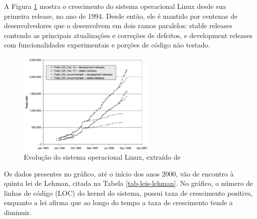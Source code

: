 A Figura \ref{Figura1} mostra o crescimento do sistema operacional Linux desde sua primeira release, no ano de 1994. Desde então, ele é mantido por centenas de desenvolvedores que o desenvolvem em dois ramos paralelos: stable releases contendo as principais atualizações e correções de defeitos, e development releases com funcionalidades experimentais e porções de código não testado.

\graphicspath{{figuras/}}
\begin{figure}[H]
\centering
\includegraphics[width=0.6\textwidth]{linux-evolution}
\caption{Evolução do sistema operacional Linux, extraído de \cite{godfrey2000evolution}}
\label{Figura1}
\end{figure}

Os dados presentes no gráfico, até o início dos anos 2000, vão de encontro à quinta lei de Lehman, citada na Tabela \ref{tab-leis-lehman}. No gráfico, o número de linhas de código (LOC) do kernel do sistema, possui taxa de crescimento positiva, enquanto a lei afirma que ao longo do tempo a taxa de crescimento tende a diminuir.%











